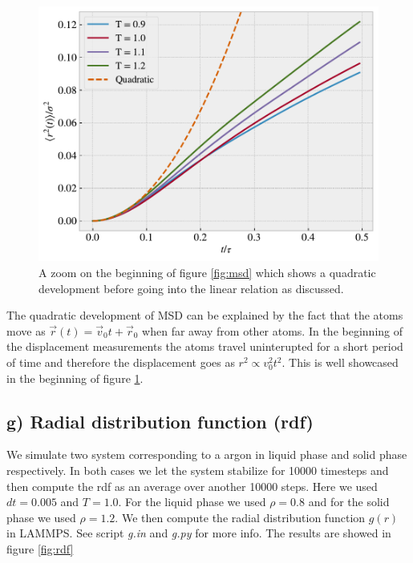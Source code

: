 \documentclass[reprint, amsmath, amssymb, aps]{revtex4-2}
\begin{document}
\begin{figure}[H]
  \includegraphics[width=\linewidth]{figures/diffusion_start.pdf}
  \caption{A zoom on the beginning of figure \ref{fig:msd} which shows a quadratic development before going into the linear relation as discussed.}
  \label{fig:diffusion_start}
\end{figure}
The quadratic development of MSD can be explained by the fact that the atoms move as $\vec{r}(t) = \vec{v}_0t + \vec{r}_0$ when far away from other atoms. In the beginning of the displacement measurements the atoms travel uninterupted for a short period of time and therefore the displacement goes as $r^2 \propto v_0^2t^2$. This is well showcased in the beginning of figure \ref{fig:diffusion_start}.
%
%
\subsection*{g) Radial distribution function (rdf)}
We simulate two system corresponding to a argon in liquid phase and solid phase respectively. In both cases we let the system stabilize for 10000 timesteps and then compute the rdf as an average over another 10000 steps. Here we used $dt = 0.005$ and $T = 1.0$. For the liquid phase we used $\rho = 0.8$ and for the solid phase we used $\rho = 1.2$. We then compute the radial distribution function $g(r)$ in LAMMPS. See script \textit{g.in} and \textit{g.py} for more info. The results are showed in figure \ref{fig:rdf}
\end{document}

